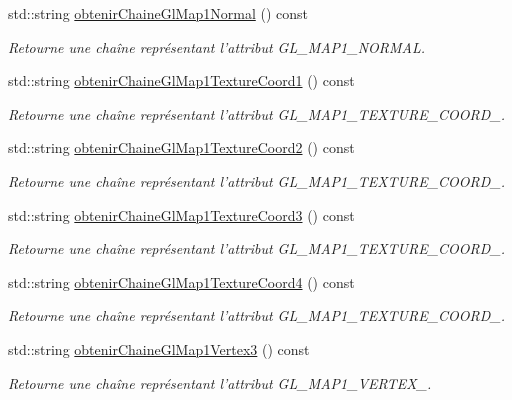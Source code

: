 \begin{DoxyCompactItemize}
std\-::string \hyperlink{group__utilitaire_gad0e75e07ddc5d51e11b4a9b525ee4190}{obtenir\-Chaine\-Gl\-Map1\-Normal} () const 
\begin{DoxyCompactList}\small\item\em Retourne une chaîne représentant l'attribut G\-L\-\_\-\-M\-A\-P1\-\_\-\-N\-O\-R\-M\-A\-L. \end{DoxyCompactList}\item 
std\-::string \hyperlink{group__utilitaire_gaf06cacbe0ee8f4fe4a6f56571fb8c27c}{obtenir\-Chaine\-Gl\-Map1\-Texture\-Coord1} () const 
\begin{DoxyCompactList}\small\item\em Retourne une chaîne représentant l'attribut G\-L\-\_\-\-M\-A\-P1\-\_\-\-T\-E\-X\-T\-U\-R\-E\-\_\-\-C\-O\-O\-R\-D\-\_. \end{DoxyCompactList}\item 
std\-::string \hyperlink{group__utilitaire_gade175aafd1123e597959f78fbe04489f}{obtenir\-Chaine\-Gl\-Map1\-Texture\-Coord2} () const 
\begin{DoxyCompactList}\small\item\em Retourne une chaîne représentant l'attribut G\-L\-\_\-\-M\-A\-P1\-\_\-\-T\-E\-X\-T\-U\-R\-E\-\_\-\-C\-O\-O\-R\-D\-\_. \end{DoxyCompactList}\item 
std\-::string \hyperlink{group__utilitaire_ga6690ab58fbdae84d2543e29cc9e4c41d}{obtenir\-Chaine\-Gl\-Map1\-Texture\-Coord3} () const 
\begin{DoxyCompactList}\small\item\em Retourne une chaîne représentant l'attribut G\-L\-\_\-\-M\-A\-P1\-\_\-\-T\-E\-X\-T\-U\-R\-E\-\_\-\-C\-O\-O\-R\-D\-\_. \end{DoxyCompactList}\item 
std\-::string \hyperlink{group__utilitaire_gab7a65aa462c3a278c42977ed9a35904e}{obtenir\-Chaine\-Gl\-Map1\-Texture\-Coord4} () const 
\begin{DoxyCompactList}\small\item\em Retourne une chaîne représentant l'attribut G\-L\-\_\-\-M\-A\-P1\-\_\-\-T\-E\-X\-T\-U\-R\-E\-\_\-\-C\-O\-O\-R\-D\-\_. \end{DoxyCompactList}\item 
std\-::string \hyperlink{group__utilitaire_gafe0e07682a0bb42bb227fecd287de609}{obtenir\-Chaine\-Gl\-Map1\-Vertex3} () const 
\begin{DoxyCompactList}\small\item\em Retourne une chaîne représentant l'attribut G\-L\-\_\-\-M\-A\-P1\-\_\-\-V\-E\-R\-T\-E\-X\-\_. \end{DoxyCompactList}\item 

\end{DoxyCompactItemize}
